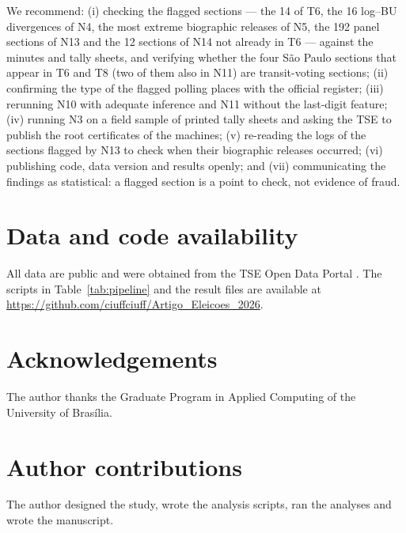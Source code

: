 \documentclass[fleqn,10pt]{SelfArx}
\begin{document}
We recommend: (i) checking the flagged sections --- the 14 of T6, the 16
log--BU divergences of N4, the most extreme biographic releases of N5,
the 192 panel sections of N13 and the 12 sections of N14 not already in T6 ---
against the minutes and tally sheets, and verifying whether the four
S\~ao Paulo sections that appear in T6 and T8 (two of them also in N11) are transit-voting
sections; (ii) confirming the type of the flagged polling places with the
official register; (iii) rerunning N10 with adequate inference and N11
without the last-digit feature; (iv) running N3 on a field sample of printed
tally sheets and asking the TSE to publish the root certificates of the
machines; (v) re-reading the logs of the sections flagged by N13 to check
when their biographic releases occurred;
(vi) publishing code, data version and results openly; and (vii)
communicating the findings as statistical: a flagged section is a point to
check, not evidence of fraud.

\section*{Data and code availability}
All data are public and were obtained from the TSE Open Data Portal
\cite{tse2026,tse2026urna}. The scripts in Table~\ref{tab:pipeline} and the
result files are available at
\url{https://github.com/ciuffciuff/Artigo_Eleicoes_2026}.

\section*{Acknowledgements}
The author thanks the Graduate Program in Applied Computing of the
University of Bras\'ilia.

\section*{Author contributions}
The author designed the study, wrote the analysis scripts, ran the analyses
and wrote the manuscript.
\end{document}
